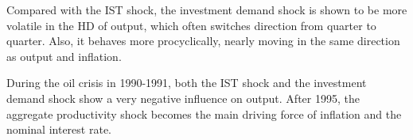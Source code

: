 Compared with the IST shock, the investment demand shock is shown to be more volatile in the HD of output, which often switches direction from quarter to quarter. Also, it behaves more procyclically, nearly moving in the same direction as output and inflation.

During the oil crisis in 1990-1991, both the IST shock and the investment demand shock show a very negative influence on output. After 1995, the aggregate productivity shock becomes the main driving force of inflation and the nominal interest rate. 